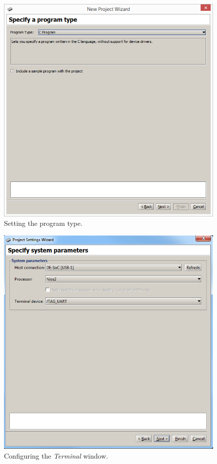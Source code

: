 \documentclass[epsfig,10pt,fullpage]{article}
\begin{document}
\begin{figure}[H]
	\begin{center}
	\includegraphics[scale=0.58]{figures/figureMP_progtype.png}
	\end{center}
	\vspace{-0.25cm}\caption{Setting the program type.}
\label{fig:MPprogtype}
\end{figure}

\begin{figure}[H]
	\begin{center}
	\includegraphics[scale=0.58]{figures/figureMP_terminal.png}
	\end{center}
	\vspace{-0.25cm}\caption{Configuring the {\it Terminal} window.}
\label{fig:MPterminal}
\end{figure}
\end{document}
